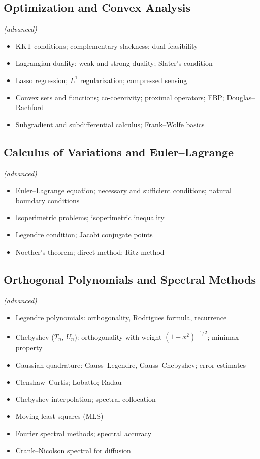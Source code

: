 \subsection{Optimization and Convex Analysis} \textit{(advanced)}

\begin{itemize}
  \item KKT conditions; complementary slackness; dual feasibility
  \item Lagrangian duality; weak and strong duality; Slater's condition
  \item Lasso regression; $L^1$ regularization; compressed sensing
  \item Convex sets and functions; co-coercivity; proximal operators; FBP; Douglas--Rachford
  \item Subgradient and subdifferential calculus; Frank--Wolfe basics
\end{itemize}

\subsection{Calculus of Variations and Euler--Lagrange} \textit{(advanced)}

\begin{itemize}
  \item Euler--Lagrange equation; necessary and sufficient conditions; natural boundary conditions
  \item Isoperimetric problems; isoperimetric inequality
  \item Legendre condition; Jacobi conjugate points
  \item Noether's theorem; direct method; Ritz method
\end{itemize}

\subsection{Orthogonal Polynomials and Spectral Methods} \textit{(advanced)}

\begin{itemize}
  \item Legendre polynomials: orthogonality, Rodrigues formula, recurrence
  \item Chebyshev ($T_n$, $U_n$): orthogonality with weight $(1-x^2)^{-1/2}$; minimax property
  \item Gaussian quadrature: Gauss--Legendre, Gauss--Chebyshev; error estimates
  \item Clenshaw--Curtis; Lobatto; Radau
  \item Chebyshev interpolation; spectral collocation
  \item Moving least squares (MLS)
  \item Fourier spectral methods; spectral accuracy
  \item Crank--Nicolson spectral for diffusion
\end{itemize}

